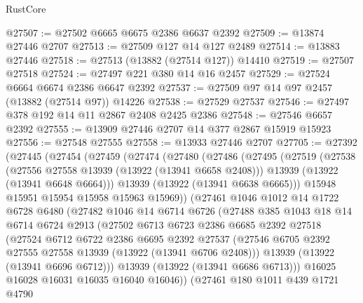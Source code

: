\begin{lexlean}{RustCore}
\begin{coremodule}
@27507 := @27502 @6665 @6675 @2386 @6637 @2392
@27509 := @13874 @27446 @2707
@27513 := @27509 @127 @14 @127 @2489
@27514 := @13883 @27446
@27518 := @27513 (@13882 (@27514 @127)) @14410
@27519 := @27507 @27518
@27524 := @27497 @221 @380 @14 @16 @2457
@27529 := @27524 @6664 @6674 @2386 @6647 @2392
@27537 := @27509 @97 @14 @97 @2457 (@13882 (@27514 @97)) @14226
@27538 := @27529 @27537
@27546 := @27497 @378 @192 @14 @11 @2867 @2408 @2425 @2386
@27548 := @27546 @6657 @2392
@27555 := @13909 @27446 @2707 @14 @377 @2867 @15919 @15923
@27556 := @27548 @27555
@27558 := @13933 @27446 @2707
@27705 := @27392
    (@27445
      (@27454
        (@27459
          (@27474
            (@27480
              (@27486
                (@27495
                  (@27519
                    (@27538
                      (@27556 @27558 @13939 (@13922 (@13941 @6658 @2408)))
                      @13939
                      (@13922 (@13941 @6648 @6664)))
                    @13939
                    (@13922 (@13941 @6638 @6665)))
                  @15948
                  @15951
                  @15954
                  @15958
                  @15963
                  @15969))
              (@27461
                @1046
                @1012
                @14
                @1722
                @6728
                @6480
                (@27482
                  @1046
                  @14
                  @6714
                  @6726
                  (@27488
                    @385
                    @1043
                    @18
                    @14
                    @6714
                    @6724
                    @2913
                    (@27502
                      @6713
                      @6723
                      @2386
                      @6685
                      @2392
                      @27518
                      (@27524
                        @6712
                        @6722
                        @2386
                        @6695
                        @2392
                        @27537
                        (@27546 @6705 @2392 @27555 @27558 @13939 (@13922 (@13941 @6706 @2408)))
                        @13939
                        (@13922 (@13941 @6696 @6712)))
                      @13939
                      (@13922 (@13941 @6686 @6713)))
                    @16025
                    @16028
                    @16031
                    @16035
                    @16040
                    @16046))
                (@27461
                  @180
                  @1011
                  @439
                  @1721
                  @4790

\end{coremodule}
\end{lexlean}

